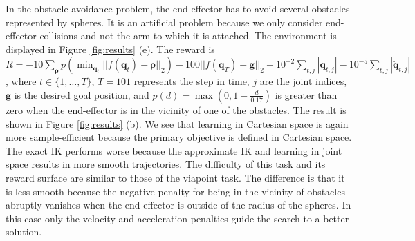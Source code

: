 \documentclass{svproc}
\begin{document}

In the obstacle avoidance problem, the end-effector has to avoid several
obstacles represented by spheres.
It is an artificial problem because we only consider end-effector collisions
and not the arm to which it is attached.
The environment is displayed in Figure \ref{fig:results} (e). The reward
is
$R = - 10 \sum_{\boldsymbol{\rho}} p\left(\min_{\boldsymbol{q}_t} ||f(\boldsymbol{q}_t) - \boldsymbol{\rho}||_2\right)
  - 100 ||f(\boldsymbol{q}_T) - \boldsymbol{g}||_2
  - 10^{-2} \sum_{t,j} |\dot{\boldsymbol{q}}_{t,j}|
  - 10^{-5} \sum_{t,j} |\ddot{\boldsymbol{q}}_{t,j}|$,
where $t \in \lbrace 1, \ldots, T \rbrace$, $T=101$ represents the step in time,
$j$ are the joint indices, $\boldsymbol{g}$ is the desired goal position,
and $p(d) = \max(0, 1 - \frac{d}{0.17})$ is greater than zero when the
end-effector is in the vicinity of one of the obstacles.
The result is shown in Figure \ref{fig:results} (b). We see that
learning in Cartesian space is again more sample-efficient because
the primary objective is defined in Cartesian space.
The exact IK performs worse because the approximate
IK and learning in joint space results in more smooth
trajectories.
The difficulty of this task and its reward surface
are similar to those of the viapoint task. The difference
is that it is less smooth because the negative penalty
for being in the vicinity of obstacles abruptly vanishes when the
end-effector is outside of the radius of the spheres. In this case
only the velocity and acceleration penalties guide the search to a
better solution.
\end{document}
